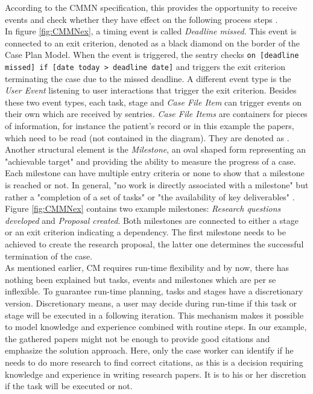 According to the CMMN specification, this provides the opportunity to receive events and check whether they have effect on the following process steps \cite{CMMNspec2014}. \\
In figure \ref{fig:CMMNex}, a timing event is called \textit{Deadline missed}. This event is connected to an exit criterion, denoted as a black diamond on the border of the Case Plan Model. When the event is triggered, the sentry checks \texttt{on [deadline missed] if [date today > deadline date]} and triggers the exit criterion terminating the case due to the missed deadline. A different event type is the \textit{User Event} listening to user interactions that trigger the exit criterion. Besides these two event types, each task, stage and \textit{Case File Item} can trigger events on their own which are received by sentries. \textit{Case File Items} are containers for pieces of information, for instance the patient's record or in this example the papers, which need to be read (not contained in the diagram). They are denoted as .\\
Another structural element is the \textit{Milestone}, an oval shaped form representing an "achievable target" \cite{CMMNspec2014} and providing the ability to measure the progress of a case. Each milestone can have multiple entry criteria or none to show that a milestone is reached or not. In general, "no work is directly associated with a milestone" \cite{CMMNspec2014} but rather a "completion of a set of tasks" or "the availability of key deliverables" \cite{CMMNspec2014}. \\
Figure \ref{fig:CMMNex} contains two example milestones: \textit{Research questions developed} and \textit{Proposal created}. Both milestones are connected to either a stage or an exit criterion indicating a dependency. The first milestone needs to be achieved to create the research proposal, the latter one determines the successful termination of the case. \\
As mentioned earlier, CM requires run-time flexibility and by now, there has nothing been explained but tasks, events and milestones which are per se inflexible. To guarantee run-time planning, tasks and stages have a discretionary version. Discretionary means, a user may decide during run-time if this task or stage will be executed in a following iteration. This mechanism makes it possible to model knowledge and experience combined with routine steps. In our example, the gathered papers might not be enough to provide good citations and emphasize the solution approach. Here, only the case worker can identify if he needs to do more research to find correct citations, as this is a decision requiring knowledge and experience in writing research papers. It is to his or her discretion if the task will be executed or not. \\
